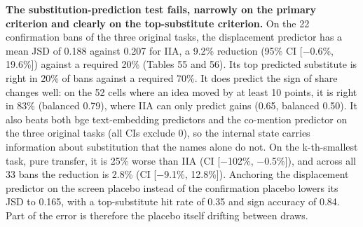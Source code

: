 \documentclass[11pt,letterpaper]{article}
\begin{document}
\endgroup
\textbf{The substitution-prediction test fails, narrowly on the primary criterion and clearly on the top-substitute criterion.} On the 22 confirmation bans of the three original tasks, the displacement predictor has a mean JSD of 0.188 against 0.207 for IIA, a 9.2\% reduction (95\% CI [\ensuremath{-}0.6\%, 19.6\%]) against a required 20\% (Tables 55 and 56). Its top predicted substitute is right in 20\% of bans against a required 70\%. It does predict the sign of share changes well: on the 52 cells where an idea moved by at least 10 points, it is right in 83\% (balanced 0.79), where IIA can only predict gains (0.65, balanced 0.50). It also beats both bge text-embedding predictors and the co-mention predictor on the three original tasks (all CIs exclude 0), so the internal state carries information about substitution that the names alone do not. On the k-th-smallest task, pure transfer, it is 25\% worse than IIA (CI [\ensuremath{-}102\%, \ensuremath{-}0.5\%]), and across all 33 bans the reduction is 2.8\% (CI [\ensuremath{-}9.1\%, 12.8\%]). Anchoring the displacement predictor on the screen placebo instead of the confirmation placebo lowers its JSD to 0.165, with a top-substitute hit rate of 0.35 and sign accuracy of 0.84. Part of the error is therefore the placebo itself drifting between draws.
\end{document}

